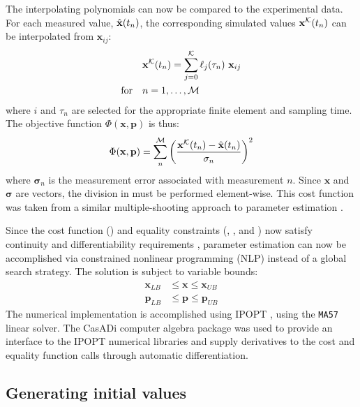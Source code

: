 The interpolating polynomials can now be compared to the experimental data.
For each measured value, $\hat{\mathbf{x}}(t_n)$, the corresponding simulated values ${\mathbf{x}}^{\cal K}(t_n)$ can be interpolated from ${\bm x}_{ij}$:
\begin{equation}
  \begin{aligned} &{\mathbf{x}}^{\cal K}(t_n) = \sum^{\cal K}_{j=0} \ell_j(\tau_n) \
    {\mathbf{x}}_{ij} \\
    \textrm{for}\quad &n = 1,\ldots,{\cal M}
  \end{aligned}
\end{equation}
where $i$ and $\tau_n$ are selected for the appropriate finite element and sampling time. 
The objective function $\Phi({\bm x},{\bm p})$ is thus:
\begin{equation} \label{eq:cost}
  \Phi({\mathbf{x}},{\mathbf{p}}) = \sum_n^{\cal M} \left(\frac{{\mathbf{x}}^{\cal K}(t_n) -
\hat{\mathbf{x}}(t_n)}{{\mathbf{\sigma}}_n}\right)^2
\end{equation}
where ${\bm \sigma}_{n}$ is the measurement error associated with measurement $n$. 
Since ${\bm x}$ and $\bm\sigma$ are vectors, the division in \fref{eq:cost} must be performed element-wise. 
This cost function was taken from a similar multiple-shooting approach to parameter estimation \cite{Bock2007}. 

Since the cost function () and equality constraints (, , and ) now satisfy continuity and differentiability requirements \cite{Floudas1995}, parameter estimation can now be accomplished via constrained nonlinear programming (NLP) instead of a global search strategy. 
The solution is subject to variable bounds:
\begin{equation}
  \begin{aligned} {\bm x}_{LB} &\le {\bm x} \le {\bm x}_{UB} \\ {\bm p}_{LB}
    &\le {\bm p} \le {\bm p}_{UB}
  \label{eq:bounds}
\end{aligned}
\end{equation}
The numerical implementation is accomplished using IPOPT \cite{Wachter2005}, using the \texttt{MA57} \cite{HSL2011} linear solver. 
The CasADi computer algebra package \cite{Andersson2013b} was used to provide an interface to the IPOPT numerical libraries and supply derivatives to the cost and equality function calls through automatic differentiation.

\subsection{Generating initial values}

